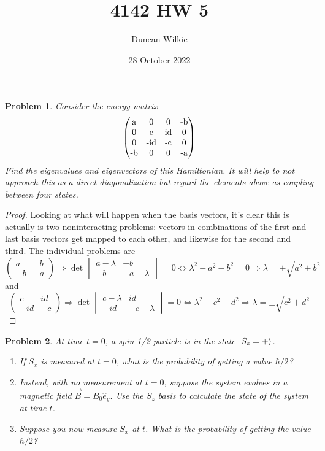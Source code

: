 \documentclass{article}
\title{4142 HW 5}
\author{Duncan Wilkie}
\date{28 October 2022}
\newtheorem{plm}{Problem}
\begin{document}
\maketitle

\begin{plm}
  Consider the energy matrix
  \[
    \begin{pmatrix}
      $a$ & 0 & 0 & $-b$ \\
      0 & $c$ & $id$ & 0 \\
      0 & $-id$ & $-c$ & 0 \\
      $-b$ & 0 & 0 &  $-a$
    \end{pmatrix}
  \]
  Find the eigenvalues and eigenvectors of this Hamiltonian.
  It will help to not approach this as a direct diagonalization but regard the elements above as coupling between four states.
\end{plm}

\begin{proof}
  Looking at what will happen when the basis vectors, it's clear this is actually is two noninteracting problems:
  vectors in combinations of the first and last basis vectors get mapped to each other, and likewise for the second and third.
  The individual problems are
  \[
    \begin{pmatrix}
      a & -b \\
      -b & -a
    \end{pmatrix}
    \Rightarrow \det
    \begin{vmatrix}
      a - \lambda & -b \\
      -b & -a - \lambda
    \end{vmatrix} = 0
    \Leftrightarrow \lambda^{2} - a^{2} - b^{2} = 0 \Rightarrow \lambda = \pm \sqrt{a^{2} + b^{2}}
  \]
  and
  \[
    \begin{pmatrix}
      c & id \\
      -id & -c
    \end{pmatrix}
    \Rightarrow \det
    \begin{vmatrix}
      c - \lambda & id \\
      -id & -c - \lambda
    \end{vmatrix}
    = 0
    \Leftrightarrow \lambda^{2} - c^{2} - d^{2} \Rightarrow \lambda = \pm \sqrt{c^{2} + d^{2}}
  \]
\end{proof}

\begin{plm}
  At time $t = 0$, a spin-1/2 particle is in the state $\ket{S_{z} = +}$.
  \begin{enumerate}
  \item If $S_{x}$ is measured at $t = 0$, what is the probability of getting a value $\hbar/2$?
  \item Instead, with no measurement at $t = 0$, suppose the system evolves in a magnetic field $\vec{B} = B_{0}\hat{e}_{y}$.
    Use the $S_{z}$ basis to calculate the state of the system at time $t$.
  \item Suppose you now measure $S_{x}$ at $t$.
    What is the probability of getting the value $\hbar/2$?
  \end{enumerate}
\end{plm}
\end{document}
